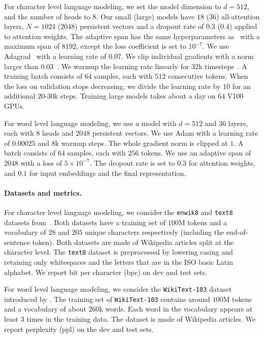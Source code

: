 \documentclass{article}
\begin{document}
For character level language modeling, we set the model dimension to $d=512$, and the number of heads to $8$.
Our small (large) models have $18$ ($36$) all-attention layers, $N=1024$ ($2048$) persistent vectors and a dropout rate of $0.3$ ($0.4$) applied to attention weights.
The adaptive span has the same hyperparameters as~\citet{sukhbaatar2019adaptive} with a maximum span of $8192$, except the loss coefficient is set to $10^{-7}$.
We use Adagrad~\cite{duchi2011adaptive} with a learning rate of $0.07$.
We clip individual gradients with a norm larger than $0.03$~\cite{pascanu2013difficulty}.
We warmup the learning rate linearly for $32$k timesteps~\cite{vaswani2017attention}.
A training batch consists of $64$ samples, each with $512$ consecutive tokens.
When the loss on validation stops decreasing, we divide the learning rate by $10$ for an additional $20$-$30$k steps.
Training large models takes about a day on $64$ V100 GPUs.

For word level language modeling, we use a model with $d=512$ and $36$ layers, each with $8$ heads and $2048$ persistent vectors.
We use Adam with a learning rate of $0.00025$ and $8$k warmup steps. The whole gradient norm is clipped at $1$. A batch consists of $64$ samples, each with $256$ tokens.
We use an adaptive span of $2048$ with a loss of $5\times10^{-7}$. The dropout rate is set to $0.3$ for attention weights, and $0.1$ for input embeddings and the final representation.

\paragraph{Datasets and metrics.}
For character level language modeling, we consider the \texttt{enwik8} and \texttt{text8} datasets from~\citet{mahoney2011large}.
Both datasets have a training set of $100$M tokens and a vocabulary of $28$ and $205$ unique characters respectively (including the end-of-sentence token).
Both datasets are made of Wikipedia articles split at the character level.
The \texttt{text8} dataset is preprocessed by lowering casing and retaining only whitespaces and the letters that are in the ISO basic Latin alphabet.
We report bit per character (bpc) on dev and test sets.

For word level language modeling, we consider the \texttt{WikiText-103} dataset introduced by \citet{merity2016pointer}.
The training set of \texttt{WikiText-103} contains around $100$M tokens and a vocabulary of about $260$k words.
Each word in the vocabulary appears at least $3$ times in the training data.
The dataset is made of Wikipedia articles.
We report perplexity (ppl) on the dev and test sets.
\end{document}

